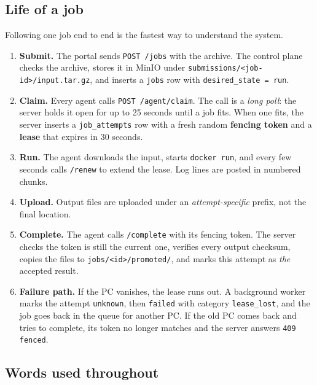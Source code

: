 \subsection{Life of a job}

Following one job end to end is the fastest way to understand the system.

\begin{enumerate}
\item \textbf{Submit.} The portal sends \texttt{POST /jobs} with the archive.
  The control plane checks the archive, stores it in MinIO under
  \texttt{submissions/<job-id>/input.tar.gz}, and inserts a \texttt{jobs} row
  with \texttt{desired\_state = run}.
\item \textbf{Claim.} Every agent calls \texttt{POST /agent/claim}. The call is
  a \emph{long poll}: the server holds it open for up to 25 seconds until a job
  fits. When one fits, the server inserts a \texttt{job\_attempts} row with a
  fresh random \textbf{fencing token} and a \textbf{lease} that expires in 30
  seconds.
\item \textbf{Run.} The agent downloads the input, starts \texttt{docker run},
  and every few seconds calls \texttt{/renew} to extend the lease. Log lines are
  posted in numbered chunks.
\item \textbf{Upload.} Output files are uploaded under an
  \emph{attempt-specific} prefix, not the final location.
\item \textbf{Complete.} The agent calls \texttt{/complete} with its fencing
  token. The server checks the token is still the current one, verifies every
  output checksum, copies the files to \texttt{jobs/<id>/promoted/}, and marks
  this attempt as \emph{the} accepted result.
\item \textbf{Failure path.} If the PC vanishes, the lease runs out. A
  background worker marks the attempt \texttt{unknown}, then \texttt{failed}
  with category \texttt{lease\_lost}, and the job goes back in the queue for
  another PC. If the old PC comes back and tries to complete, its token no
  longer matches and the server answers \texttt{409 fenced}.
\end{enumerate}

\subsection{Words used throughout}

